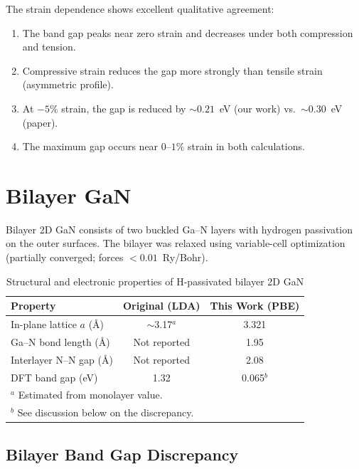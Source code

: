 \documentclass[11pt]{article}
\begin{document}
The strain dependence shows excellent qualitative agreement:
\begin{enumerate}
    \item The band gap peaks near zero strain and decreases under both compression and tension.
    \item Compressive strain reduces the gap more strongly than tensile strain (asymmetric profile).
    \item At $-5\%$ strain, the gap is reduced by $\sim 0.21$~eV (our work) vs.\ $\sim 0.30$~eV (paper).
    \item The maximum gap occurs near $0$--$1\%$ strain in both calculations.
\end{enumerate}

\section{Bilayer GaN}
\label{sec:bilayer}

Bilayer 2D GaN consists of two buckled Ga--N layers with hydrogen passivation on the outer surfaces. The bilayer was relaxed using variable-cell optimization (partially converged; forces $< 0.01$~Ry/Bohr).

\begin{table}[H]
\centering
\caption{Structural and electronic properties of H-passivated bilayer 2D GaN}
\label{tab:bilayer}
\begin{tabular}{@{}lcc@{}}
\toprule
\textbf{Property} & \textbf{Original (LDA)} & \textbf{This Work (PBE)} \\
\midrule
In-plane lattice $a$ (\AA) & $\sim$3.17$^a$ & 3.321 \\
Ga--N bond length (\AA) & Not reported & 1.95 \\
Interlayer N--N gap (\AA) & Not reported & 2.08 \\
DFT band gap (eV) & 1.32 & 0.065$^b$ \\
\bottomrule
\multicolumn{3}{l}{\footnotesize $^a$ Estimated from monolayer value.} \\
\multicolumn{3}{l}{\footnotesize $^b$ See discussion below on the discrepancy.} \\
\end{tabular}
\end{table}

\subsection{Bilayer Band Gap Discrepancy}
\end{document}
